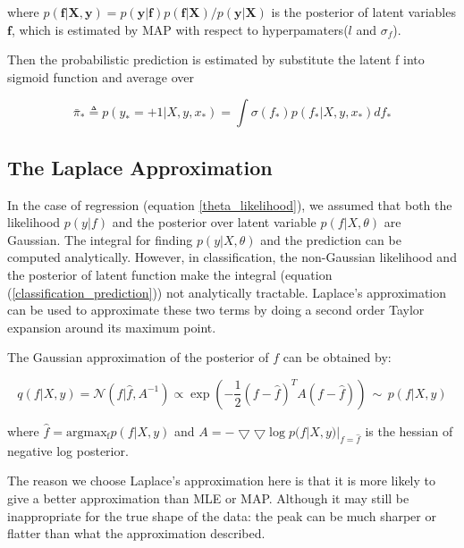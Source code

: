 \documentclass[11pt]{report}
\numberwithin{equation}{chapter}
\begin{document}
\begin{spacing}{2}
where \(p(\boldsymbol f|\boldsymbol X,\boldsymbol y) = {p(\boldsymbol y|\boldsymbol f)p(\boldsymbol f|\boldsymbol X)}/{p(\boldsymbol y|\boldsymbol X)}\) is the posterior of latent variables $\boldsymbol f$, which is estimated by MAP with respect to hyperpamaters($l$ and $\sigma_f$).

Then the probabilistic prediction is estimated by substitute the latent f into sigmoid function and average over 

\begin{equation}
\label{predictive_probability}
\bar{\pi}_* \triangleq p(y_* = +1|X,y,x_*) = \int \sigma (f_*)p(f_*|X,y,x_*) df_*
\end{equation}


\subsection{The Laplace Approximation}

In the case of regression (equation \ref{theta_likelihood}), we assumed that both the likelihood $p(y|f)$ and the posterior over latent variable $p(f|X,\theta)$ are Gaussian. The integral for finding $p(y|X,\theta)$ and the prediction can be computed analytically. However, in classification, the non-Gaussian likelihood and the posterior of latent function make the integral (equation (\ref{classification_prediction})) not analytically tractable. Laplace's approximation can be used to approximate these two terms by doing a second order Taylor 		expansion around its maximum point. 

The Gaussian approximation of the posterior of $f$ can be obtained by:


\begin{equation}\label{LaplaceApp}
q(f|X,y) = \mathcal{N}(f|\hat{f},A^{-1}) \propto \operatorname{exp}(-\frac{1}{2}(f-\hat{f})^T A(f-\hat{f})) \,\sim\, p(f|X,y)
\end{equation}

where $\hat{f} = \operatorname{argmax_f} p(f|X,y)$ and $A = -\bigtriangledown\bigtriangledown \operatorname{log}p(f|X,y)|_{f=\hat{f}}$ is the hessian of negative log posterior.


The reason we choose Laplace's approximation here is that it is more likely to give a better approximation than MLE or MAP\cite{azevedo1994laplace}. Although it may still be inappropriate for the true shape of the data: the peak can be much sharper or flatter than what the approximation described. 




\end{spacing}
\end{document}

